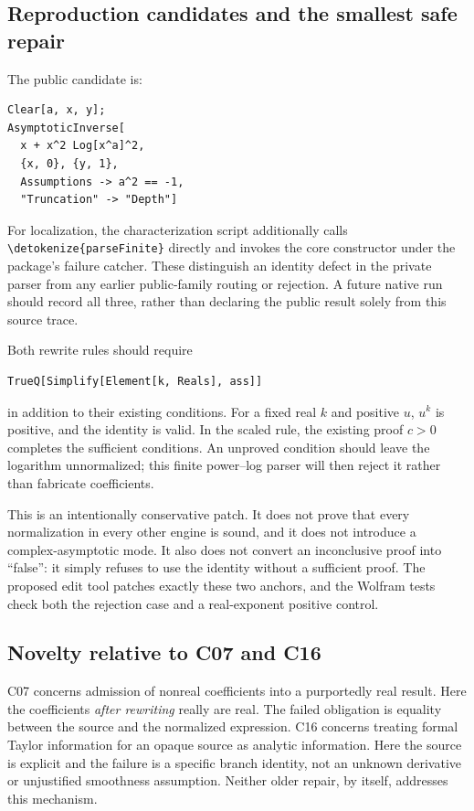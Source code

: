 \documentclass[11pt,a4paper]{article}
\newcommand{\wl}[1]{\texttt{\expandafter\nolinkurl\expandafter{\detokenize{#1}}}}
\begin{document}
\subsection{Reproduction candidates and the smallest safe repair}

The public candidate is:
\begin{lstlisting}
Clear[a, x, y];
AsymptoticInverse[
  x + x^2 Log[x^a]^2,
  {x, 0}, {y, 1},
  Assumptions -> a^2 == -1,
  "Truncation" -> "Depth"]
\end{lstlisting}
For localization, the characterization script additionally calls
\wl{parseFinite} directly and invokes the core constructor under the package's
failure catcher. These distinguish an identity defect in the private parser
from any earlier public-family routing or rejection. A future native run should
record all three, rather than declaring the public result solely from this
source trace.

Both rewrite rules should require
\begin{lstlisting}
TrueQ[Simplify[Element[k, Reals], ass]]
\end{lstlisting}
in addition to their existing conditions. For a fixed real $k$ and positive
$u$, $u^k$ is positive, and the identity is valid. In the scaled rule, the existing
proof $c>0$ completes the sufficient conditions. An unproved condition should
leave the logarithm unnormalized; this finite power--log parser will then reject
it rather than fabricate coefficients.

This is an intentionally conservative patch. It does not prove that every
normalization in every other engine is sound, and it does not introduce a
complex-asymptotic mode. It also does not convert an inconclusive proof into
``false'': it simply refuses to use the identity without a sufficient proof.
The proposed edit tool patches exactly these two anchors, and the Wolfram tests
check both the rejection case and a real-exponent positive control.

\subsection{Novelty relative to C07 and C16}

C07 concerns admission of nonreal coefficients into a purportedly real result.
Here the coefficients \emph{after rewriting} really are real. The failed
obligation is equality between the source and the normalized expression.
C16 concerns treating formal Taylor information for an opaque source as analytic
information. Here the source is explicit and the failure is a specific branch
identity, not an unknown derivative or unjustified smoothness assumption.
Neither older repair, by itself, addresses this mechanism.\cite{status,r11,r18}
\end{document}
